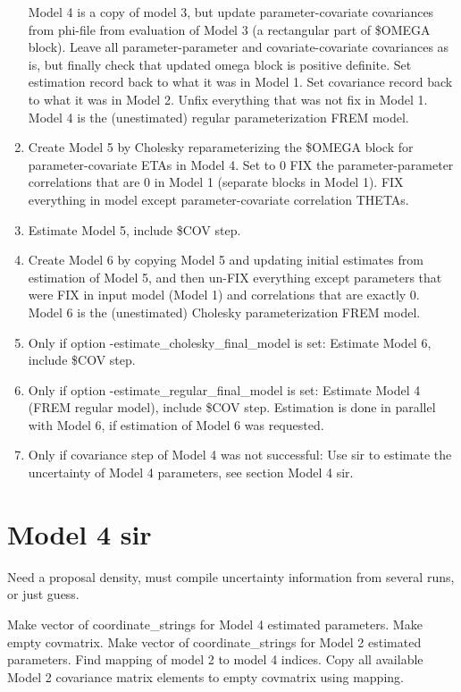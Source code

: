 \begin{enumerate}
Model 4 is a copy of model 3, but update parameter-covariate covariances from phi-file from evaluation of Model 3
(a rectangular part of \$OMEGA block).
Leave all parameter-parameter and covariate-covariate covariances as is, but
finally check that updated omega block is positive definite.
Set estimation record back to what it was in Model 1.
Set covariance record back to what it was in Model 2.
Unfix everything that was not fix in Model 1.
Model 4 is the (unestimated) regular parameterization FREM model.
\item
Create Model 5 by
Cholesky reparameterizing the \$OMEGA block
for parameter-covariate ETAs in Model 4.
Set to 0 FIX the parameter-parameter correlations that are 0 in Model 1 (separate blocks in Model 1).
FIX everything in model except parameter-covariate correlation THETAs.
\item Estimate Model 5, include \$COV step.
\item Create Model 6 
by copying Model 5 and updating initial estimates from
estimation of Model 5, and then un-FIX everything except parameters that
were FIX in input model (Model 1) and correlations that are exactly 0.
Model 6 is the (unestimated) Cholesky parameterization FREM model.
\item Only if option -estimate\_cholesky\_final\_model is set:
Estimate Model 6, include \$COV step.
\item Only if option -estimate\_regular\_final\_model is set:
Estimate Model 4 (FREM regular model), include \$COV step.
Estimation is done in parallel with Model 6, if estimation of Model 6 was requested.
\item Only if covariance step of Model 4 was not successful:
Use sir to estimate the uncertainty of Model 4 parameters, see section Model 4 sir.
\end{enumerate}

\section{Model 4 sir}

Need a proposal density, must compile uncertainty information from several runs, or just guess.


Make vector of coordinate\_strings for Model 4 estimated parameters.
Make empty covmatrix.
Make vector of coordinate\_strings for Model 2 estimated parameters.
Find mapping of model 2 to model 4 indices.
Copy all available Model 2 covariance matrix elements to empty covmatrix using mapping.

